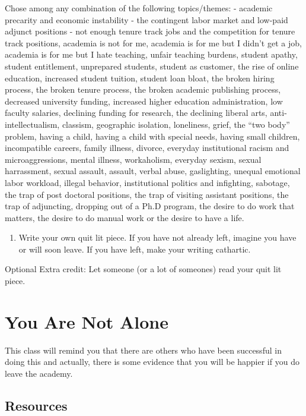 \documentclass[]{book}
\providecommand{\tightlist}{%
  \setlength{\itemsep}{0pt}\setlength{\parskip}{0pt}}
\begin{document}
Chose among any combination of the following topics/themes: - academic
precarity and economic instability - the contingent labor market and
low-paid adjunct positions - not enough tenure track jobs and the
competition for tenure track positions, academia is not for me, academia
is for me but I didn't get a job, academia is for me but I hate
teaching, unfair teaching burdens, student apathy, student entitlement,
unprepared students, student as customer, the rise of online education,
increased student tuition, student loan bloat, the broken hiring
process, the broken tenure process, the broken academic publishing
process, decreased university funding, increased higher education
administration, low faculty salaries, declining funding for research,
the declining liberal arts, anti-intellectualism, classism, geographic
isolation, loneliness, grief, the ``two body'' problem, having a child,
having a child with special needs, having small children, incompatible
careers, family illness, divorce, everyday institutional racism and
microaggressions, mental illness, workaholism, everyday sexism, sexual
harrassment, sexual assault, assault, verbal abuse, gaslighting, unequal
emotional labor workload, illegal behavior, institutional politics and
infighting, sabotage, the trap of post doctoral positions, the trap of
visiting assistant positions, the trap of adjuncting, dropping out of a
Ph.D program, the desire to do work that matters, the desire to do
manual work or the desire to have a life.

\begin{enumerate}
\def\labelenumi{\arabic{enumi})}
\setcounter{enumi}{1}
\tightlist
\item
  Write your own quit lit piece. If you have not already left, imagine
  you have or will soon leave. If you have left, make your writing
  cathartic.
\end{enumerate}

Optional Extra credit: Let someone (or a lot of someones) read your quit
lit piece.

\chapter{You Are Not Alone}\label{you-are-not-alone}

This class will remind you that there are others who have been
successful in doing this and actually, there is some evidence that you
will be happier if you do leave the academy.

\section{Resources}\label{resources}
\end{document}
